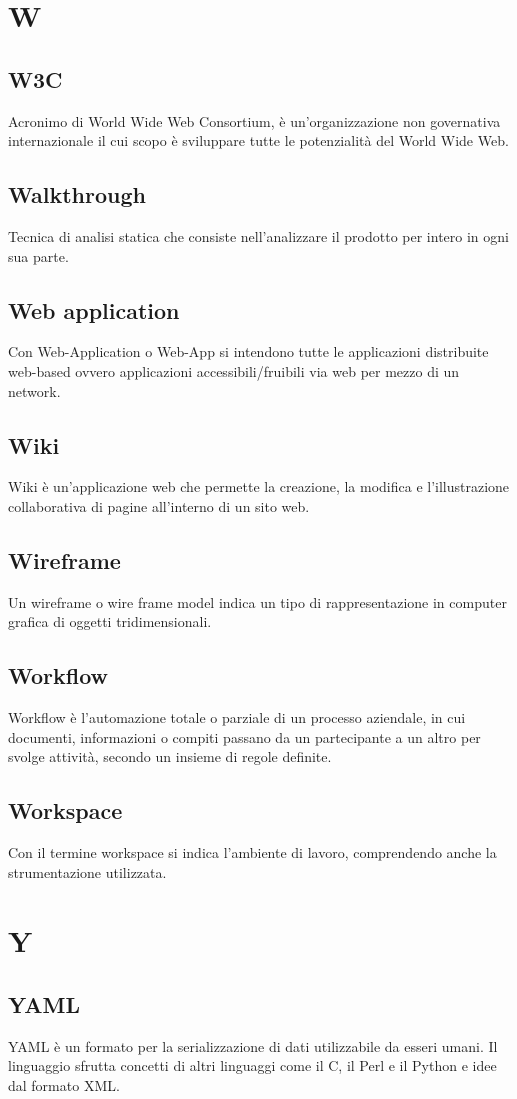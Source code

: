 \newpage \section{W}
\subsection{W3C} Acronimo di World Wide Web Consortium, è un'organizzazione non governativa internazionale il cui scopo è sviluppare tutte le potenzialità del World Wide Web.
\subsection{Walkthrough} Tecnica di analisi statica che consiste nell'analizzare il prodotto per intero in ogni sua parte.
\subsection{Web application} Con Web-Application o Web-App si intendono tutte le applicazioni distribuite web-based ovvero applicazioni accessibili/fruibili via web per mezzo di un network. 
\subsection{Wiki}  Wiki è un'applicazione web che permette la creazione, la modifica e l'illustrazione collaborativa di pagine all'interno di un sito web.
\subsection{Wireframe} Un wireframe o wire frame model indica un tipo di rappresentazione in computer grafica di oggetti tridimensionali.
\subsection{Workflow} Workflow è l’automazione totale o parziale di un processo aziendale, in cui documenti, informazioni o compiti passano da un partecipante a un altro per svolge attività, secondo un insieme di regole definite.
\subsection{Workspace} Con il termine workspace si indica l'ambiente di lavoro, comprendendo anche la strumentazione utilizzata.

\newpage \section{Y}
\subsection{YAML}  YAML è un formato per la serializzazione di dati utilizzabile da esseri umani. Il linguaggio sfrutta concetti di altri linguaggi come il C, il Perl e il Python e idee dal formato XML.
